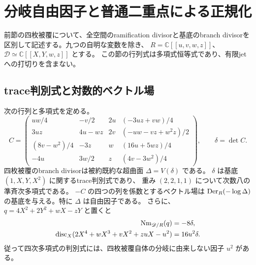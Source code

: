 \section{分岐自由因子と普通二重点による正規化}\label{sec:four-branch-v24}

前節の四枚被覆について、全空間のramification divisorと基底のbranch divisorを
区別して記述する。九つの自明な変数を除き、
$R=\mathbb C[[u,v,w,z]]$、$\mathscr D\simeq\mathbb C[[X,Y,w,z]]$ とする。
この節の行列式は多項式恒等式であり、有限jetへの打切りを含まない。

\subsection{trace判別式と対数的ベクトル場}

\begin{theorem}\label{thm:four-free-discriminant-v24}
次の行列と多項式を定める。
\begin{equation}\label{eq:four-discriminant-matrix-v24}
C=\begin{pmatrix}
 uw/4&-v/2&2u&(-3uz+vw)/4\\
 3uz&4u-wz&2v&(-uw-vz+w^2z)/2\\
 (8v-w^2)/4&-3z&w&(16u+5wz)/4\\
 -4u&3w/2&z&(4v-3w^2)/4
\end{pmatrix},\qquad \delta=\det C.
\end{equation}
四枚被覆のbranch divisorは被約既約な超曲面 $\Delta=V(\delta)$ である。
$\delta$ は基底 $(1,X,Y,X^2)$ に関するtrace判別式であり、
重み $(2,2,1,1)$ について次数八の準斉次多項式である。
$-C$ の四つの列を係数とするベクトル場は
$\operatorname{Der}_R(-\log\Delta)$ の基底を与える。特に $\Delta$ は自由因子である。
さらに、$q=4X^2+2Y^2+wX-zY$ と置くと
\begin{align}
 \operatorname{Nm}_{\mathscr D/R}(q)&=-8\delta,\label{eq:four-norm-v24}\\
 \operatorname{disc}_X(2X^4+wX^3+vX^2+zuX-u^2)&=16u^2\delta.
 \label{eq:four-quartic-index-v24}
\end{align}
従って四次多項式の判別式には、四枚被覆自体の分岐に由来しない因子 $u^2$ がある。
\end{theorem}

